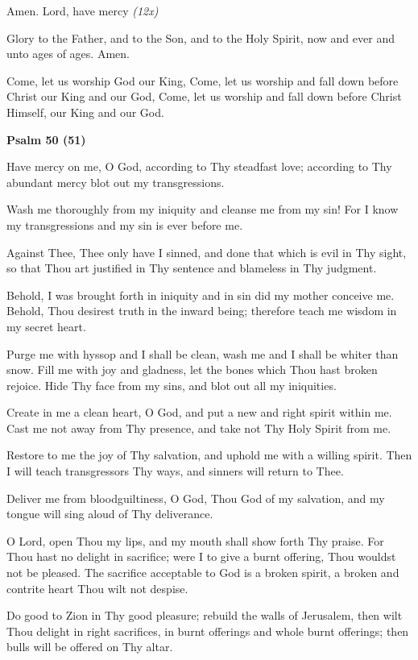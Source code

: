 \begin{hang}
\noindent{}Amen.  Lord, have mercy \textit{(12x)}

Glory to the Father, and to the Son, and to the Holy Spirit, now and ever and unto ages of ages. Amen.

Come, let us worship God our King, Come, let us worship and fall down before 
Christ our King and our God, Come, let us worship and fall down before Christ 
Himself, our King and our God.

\end{hang}

\begin{center}
\textbf{Psalm 50 (51)}
\end{center}

\begin{hang}
\noindent{}Have mercy on me, O God, according to Thy 
steadfast love; according to Thy abundant mercy blot out my transgressions.

Wash me thoroughly from my iniquity and cleanse me from my sin!  For I know my 
transgressions and my sin is ever before me.

Against Thee, Thee only have I sinned, and done that which is evil in Thy 
sight, so that Thou art justified in Thy sentence and blameless in Thy judgment.

Behold, I was brought forth in iniquity and in sin did my mother conceive me.  
Behold, Thou desirest truth in the inward being; therefore teach me wisdom in 
my secret heart.

Purge me with hyssop and I shall be clean, wash me and I shall be whiter than 
snow.  Fill me with joy and gladness, let the bones which Thou hast broken 
rejoice.  Hide Thy face from my sins, and blot out all my iniquities.

Create in me a clean heart, O God, and put a new and right spirit within me.  
Cast me not away from Thy presence, and take not Thy Holy Spirit from me.

Restore to me the joy of Thy salvation, and uphold me with a willing spirit.  
Then I will teach transgressors Thy ways, and sinners will return to Thee.

Deliver me from bloodguiltiness, O God, Thou God of my salvation, and my tongue 
will sing aloud of Thy deliverance.

O Lord, open Thou my lips, and my mouth shall show forth Thy praise.  For Thou 
hast no delight in sacrifice; were I to give a burnt offering, Thou wouldst not 
be pleased.  The sacrifice acceptable to God is a broken spirit, a broken and 
contrite heart Thou wilt not despise.

Do good to Zion in Thy good pleasure; rebuild the walls of Jerusalem, then wilt 
Thou delight in right sacrifices, in burnt offerings and whole burnt offerings; 
then bulls will be offered on Thy altar.

\end{hang}

